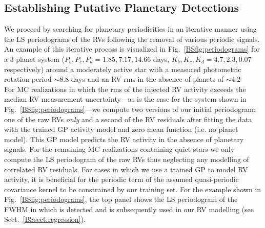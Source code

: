 \subsection{Establishing Putative Planetary Detections} \label{BSsect:det}
We proceed by searching for planetary periodicities in an iterative manner using the LS periodograms
of the RVs following the removal of various periodic signals.
An example of this iterative process is visualized in Fig.~\ref{BSfig:periodograms} for a 3 planet system
($P_b,P_c,P_d=1.85,7.17,14.66$ days, $K_b,K_c,K_d=4.7,2.3,0.07$ \mps{} respectively)
around a moderately active star with a measured photometric rotation period \prot{} $\sim 8.8$ days and
an RV rms in the absence of planets of $\sim 4.2$  \\

For MC realizations in which the rms of the injected RV activity exceeds the median RV measurement
uncertainty---as is the case for the system shown in Fig.~\ref{BSfig:periodograms}---we compute two
versions of our initial periodogram: one of the raw RVs \emph{only} and a second
of the RV residuals after fitting the data with the trained GP activity model and zero mean function
(i.e. no planet model). This GP model predicts the RV activity in the absence of planetary signals.
For the remaining MC realizations containing quiet stars
we only compute the LS periodogram of the raw RVs thus neglecting any
modelling of correlated RV residuals. For cases in which we use a trained GP to model RV activity,
it is beneficial for
the periodic term of the assumed quasi-periodic covariance kernel to be constrained by our training set.
For the example shown in Fig.~\ref{BSfig:periodograms}, the top panel shows the LS periodogram of the FWHM
in which \prot{} is detected and is subsequently used in our RV modelling (see Sect.~\ref{BSsect:regression}). \\

